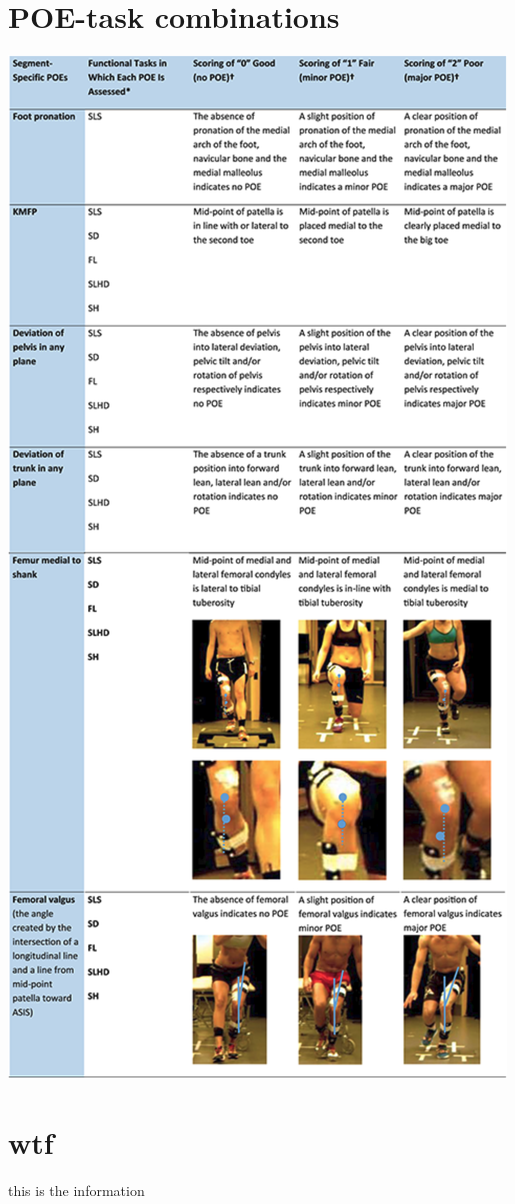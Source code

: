 \appendix


\chapter[POE-task combinations]{POE-task combinations \cite{Nae2020b}} \label{app:poe-task}
  \centering
  \includegraphics[trim=0 60 0 0, clip, height=0.9\textheight]{files/figs/poes-detailed-rot.png}


\chapter{wtf}
this is the information
